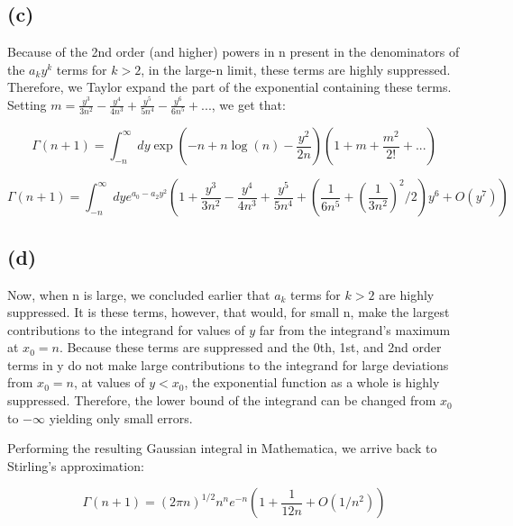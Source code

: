 \subsection*{(c)
}
{\bfseries 
}

Because of the 2nd order (and higher) powers in n present in the denominators of the $a_ky^k$ terms for $k>2$, in the large-n limit, these terms are highly suppressed. Therefore, we Taylor expand the part of the exponential containing these terms. Setting $m= \frac{y^3}{3 n^2} - \frac{y^4}{4n^3} + \frac{y^5}{5 n^4} - \frac{y^6}{6 n^5}+...$, we get that:

\[\Gamma(n+1)=\int_{-n}^{\infty}dy \exp(-n + n\log(n) - \frac{y^2}{2n})(1+m+\frac{m^2}{2!}+...)\]

\[\Gamma(n+1)=\int_{-n}^{\infty}dy e^{a_0-a_2y^2}(1+ \frac{y^3}{3 n^2}- \frac{y^4}{4n^3}+\frac{y^5}{5 n^4}+(\frac{1}{6 n^5}+(\frac{1}{3 n^2})^{2}/2)y^{6}+O(y^7))\]

\subsection*{(d)
}
{\bfseries 
}
Now, when n is large, we concluded earlier that $a_k$ terms for $k>2$ are highly suppressed. It is these terms, however, that would, for small n, make the largest contributions to the integrand for values of $y$ far from the integrand's maximum at $x_0=n$. Because these terms are suppressed and the 0th, 1st, and 2nd order terms in y do not make large contributions to the integrand for large deviations from $x_0=n$, at values of $y<x_0$, the exponential function as a whole is highly suppressed. Therefore, the lower bound of the integrand can be changed from $x_0$ to $-\infty$ yielding only small errors.

Performing the resulting Gaussian integral in Mathematica, we arrive back to Stirling's approximation:

\[\Gamma(n+1)=(2\pi n)^{1/2}n^{n}e^{-n}(1+\frac{1}{12n}+O(1/n^2))\]